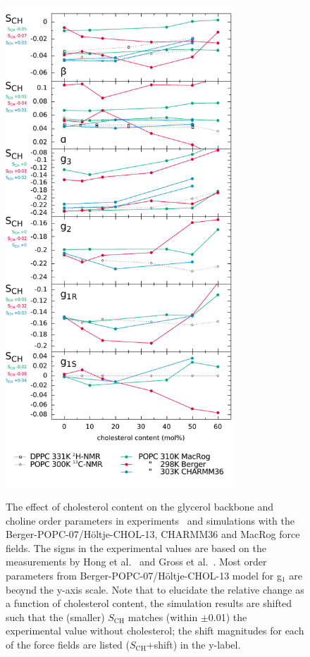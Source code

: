 \documentclass[journal=jacsat,manuscript=article]{achemso}
\begin{document}
\begin{figure}[]
  \centering
  \includegraphics[width=8.6cm]{../DATAreportediINblog/cholesterolization.pdf}
   \\
  \caption{\label{ordPchol}
    The effect of cholesterol content on the glycerol backbone and choline order parameters in experiments~\cite{brown78,ferreira13} and simulations
    with the Berger-POPC-07/H\"oltje-CHOL-13, CHARMM36 and MacRog force fields. The signs in the experimental values are based on the measurements by Hong et al.~\cite{hong95a,hong95b} 
    and Gross et al.~\cite{gross97}.  Most order parameters from Berger-POPC-07/H\"oltje-CHOL-13 model for g$_1$ are beoynd the y-axis scale.
    Note that to elucidate the relative change as a function of cholesterol content,
    the simulation results are shifted such that the (smaller) $S_\mathrm{CH}$
    matches (within $\pm$0.01) the experimental value without cholesterol;
    the shift magnitudes for each of the force fields are listed ($S_\mathrm{CH}$+shift) in the y-label.
}
\end{figure}
\end{document}
